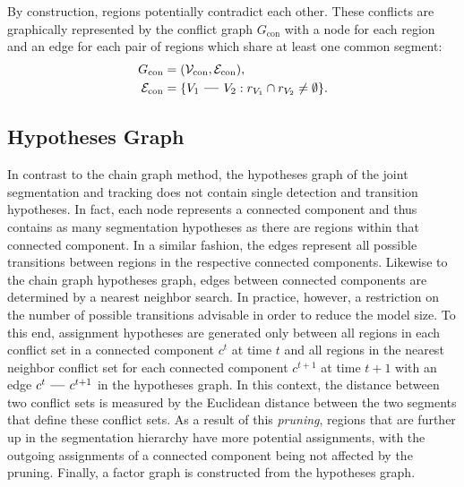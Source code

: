 By construction, regions potentially contradict each other. These conflicts are graphically
represented by the conflict graph $G_{\text{con}}$ with a node for each region and an edge for each
pair of regions which share at least one common segment:
\begin{align}
    G_{\text{con}} &= (\mathcal{V}_{\text{con}}, \mathcal{E}_{\text{con}}), \\
    \mathcal{E}_{\text{con}} &= \{V_1 \textbf{ --- } V_2  : r_{V_1} \cap r_{V_2} \ne \emptyset\}.
\end{align}

\subsection{Hypotheses Graph}
\label{subsec:joint-hypotheses-graph}
In contrast to the chain graph method, the hypotheses graph of the joint segmentation and tracking
does not contain single detection and transition hypotheses. In fact, each node represents a
connected component and thus contains as many segmentation hypotheses as there are regions within
that connected component. In a similar fashion, the edges represent all possible transitions between
regions in the respective connected components.  Likewise to the chain graph hypotheses graph, edges
between connected components are determined by a nearest neighbor search. In practice, however, a
restriction on the number of possible transitions advisable in order to reduce the model size. To
this end, assignment hypotheses are generated only between all regions in each conflict set in a
connected component $c^t$ at time $t$ and all regions in the nearest neighbor conflict set for each
connected component $c^{t+1}$ at time $t+1$ with an edge $c^t \textbf{ --- } c^{t+1}$ in the hypotheses
graph. In this context, the distance between two conflict sets is measured by the Euclidean distance
between the two segments that define these conflict sets. As a result of this \emph{pruning},
regions that are further up in the segmentation hierarchy have more potential assignments, with the
outgoing assignments of a connected component being not affected by the pruning. Finally, a factor
graph is constructed from the hypotheses graph.


